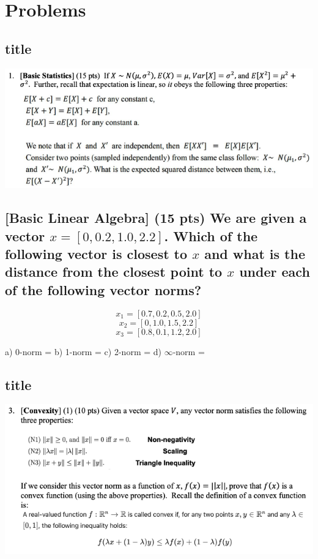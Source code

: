 \section{Problems}

\subsection{title}

\includegraphics[width=1\textwidth]{media/hw2_q1.png}

\subsection{[Basic Linear Algebra] (15 pts) We are given a vector $x = [0, 0.2, 1.0, 2.2]$. Which of the following vector is closest to $x$ and what is the distance from the closest point to $x$ under each of the following vector norms?}

$$x_1 = [0.7, 0.2, 0.5, 2.0]$$
$$x_2 = [0, 1.0, 1.5, 2.2]$$
$$x_3 = [0.8, 0.1, 1.2, 2.0]$$

a) 0-norm =
b) 1-norm =
c) 2-norm =
d) $\infty$-norm =

\subsection{title}

\includegraphics[width=1\textwidth]{media/hw2_q3.png}

